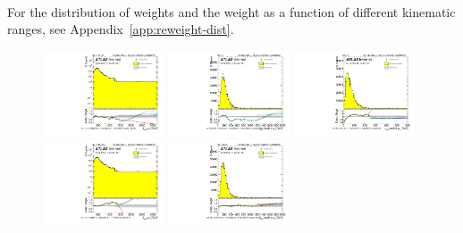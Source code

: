 \paragraph{}
For the distribution of weights and the weight as a function of different kinematic ranges, see Appendix~\ref{app:reweight-dist}.
\begin{figure}[htbp!]
\begin{center}
\includegraphics[angle=270, width=0.32\textwidth]{./figures/boosted/Reweight/Fits/Moriond_NoTag_2Trk_split_lead_Incl_sublHCand_Pt_m_1.pdf}
\includegraphics[angle=270, width=0.32\textwidth]{./figures/boosted/Reweight/Fits/Moriond_NoTag_2Trk_split_lead_Incl_sublHCand_trk0_Pt.pdf}
\includegraphics[angle=270, width=0.32\textwidth]{./figures/boosted/Reweight/Fits/Moriond_NoTag_2Trk_split_lead_Incl_sublHCand_trk1_Pt.pdf} \\
\includegraphics[angle=270, width=0.32\textwidth]{./figures/boosted/Reweight/Fits/Moriond_bkg_0_NoTag_2Trk_split_lead_Incl_sublHCand_Pt_m_1.pdf}
\includegraphics[angle=270, width=0.32\textwidth]{./figures/boosted/Reweight/Fits/Moriond_bkg_0_NoTag_2Trk_split_lead_Incl_sublHCand_trk0_Pt.pdf}

\end{center}
\end{figure}
